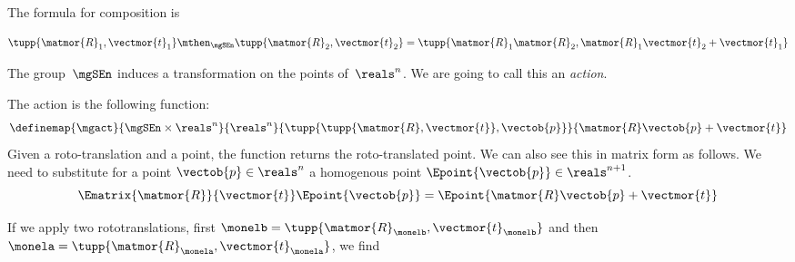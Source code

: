 The formula for composition is

\begin{equation}\label{eq:SE-composition-short}
  \tupp{\matmor{R}_1, \vectmor{t}_1} \mthen_{\mgSEn} \tupp{\matmor{R}_2, \vectmor{t}_2}  = \tupp{\matmor{R}_1 \matmor{R}_2, \matmor{R}_1 \vectmor{t}_2 + \vectmor{t}_1}
\end{equation}

%

The group~$\mgSEn$ induces a transformation on the points of~$\reals^n$.
We are going to call this an \emph{action}.

The action is the following function:
% 
\begin{equation}\label{eq:apply}
\definemap{\mgact}{\mgSEn \times \reals^n}{\reals^n}{\tupp{ \tupp{\matmor{R}, \vectmor{t}}, \vectob{p}}}{\matmor{R}\vectob{p} + \vectmor{t}}
\end{equation}
Given a roto-translation and a point, the function returns the roto-translated point.
%
We can also see this in matrix form as follows. We need to substitute for a point $\vectob{p} \in \reals^n$ a homogenous point
$ \Epoint{\vectob{p}} \in \reals^{n+1}$.
%
\begin{equation}\label{eq:homogenous}
\Ematrix{\matmor{R}}{\vectmor{t}}
\Epoint{\vectob{p}}
 =
 \Epoint{\matmor{R}\vectob{p} + \vectmor{t}}
\end{equation}



If we apply two rototranslations, first $\monelb=\tupp{\matmor{R}_{\monelb}, \vectmor{t}_{\monelb}}$ and then $\monela=\tupp{\matmor{R}_{\monela}, \vectmor{t}_{\monela}}$, we find
%


